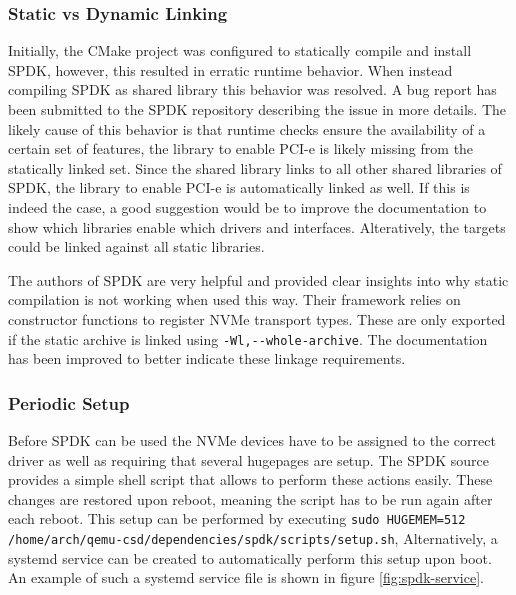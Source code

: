 \documentclass[conference]{IEEEtran}
\newcommand\bashstyle{
	\lstset{
		language=Bash,
		basicstyle=\ttm,
		showstringspaces=false,
		tabsize=2,
		aboveskip=0.2cm,
		belowskip=0.2cm,
		prebreak=\textbackslash,
		extendedchars=true,
		mathescape=false,
		linewidth=8.85cm,
		breaklines=true
	}
}
\newcommand\bashinline[1]{{\bashstyle\lstinline!#1!}}
\begin{document}

\subsubsection{Static vs Dynamic Linking}

Initially, the CMake project was configured to statically compile and install
SPDK, however, this resulted in erratic runtime behavior. When instead compiling
SPDK as shared library this behavior was resolved. A bug report has been
submitted to the SPDK repository describing the issue in more
details\cite{spdk-bug}. The likely cause of this behavior is that runtime checks
ensure the availability of a certain set of features, the library to enable
PCI-e is likely missing from the statically linked set. Since the shared
library links to all other shared libraries of SPDK, the library to enable
PCI-e is automatically linked as well. If this is indeed the case, a good
suggestion would be to improve the documentation to show which libraries enable
which drivers and interfaces. Alteratively, the targets could be linked against
all static libraries.

The authors of SPDK are very helpful and provided clear insights into why
static compilation is not working when used this way. Their framework relies on
constructor functions to register NVMe transport types. These are only exported
if the static archive is linked using\bashinline{-Wl,--whole-archive}. The
documentation has been improved to better indicate these linkage
requirements\cite{spdk-documentation-patch}.

\subsubsection{Periodic Setup}

Before SPDK can be used the NVMe devices have to be assigned to the correct
driver as well as requiring that several hugepages are setup. The SPDK source
provides a simple shell script that allows to perform these actions easily.
These  changes are restored upon reboot, meaning the script has to be run again
after each reboot. This setup can be performed by
executing\bashinline{sudo HUGEMEM=512 /home/arch/qemu-csd/dependencies/spdk/scripts/setup.sh},
Alternatively, a systemd service can be created to automatically perform this
setup upon boot. An example of such a systemd service file is shown in
figure \ref{fig:spdk-service}.
\end{document}
